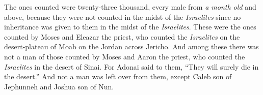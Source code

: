 \begin{biblechapter}
\verse The ones counted were twenty-three thousand, every male from \textit{a month old} and above, because they were not counted in the midst of the \textit{Israelites} since no inheritance was given to them in the midst of the \textit{Israelites}.
\verse These were the ones counted by Moses and Eleazar the priest, who counted the \textit{Israelites} on the desert-plateau of Moab on the Jordan across Jericho.
\verse And among these there was not a man of those counted by Moses and Aaron the priest, who counted the \textit{Israelites} in the desert of Sinai.
\verse For Adonai said to them, “They will surely die in the desert.” And not a man was left over from them, except Caleb son of Jephunneh and Joshua son of Nun.
\end{biblechapter}


